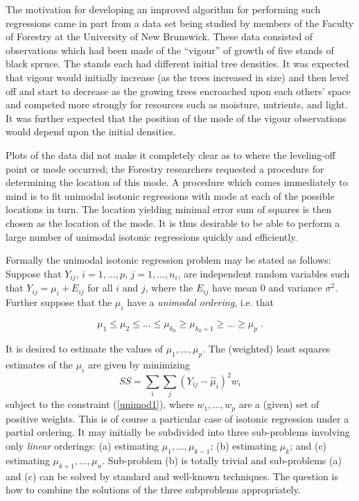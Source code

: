 The motivation for developing an improved algorithm for performing
such regressions came in part from a data set being studied by
members of the Faculty of Forestry at the University of New Brunswick.
These data consisted of observations which had been made of the
``vigour'' of growth of five stands of black spruce.  The stands each
had different initial tree densities.  It was expected that vigour
would initially increase (as the trees increased in size) and then
level off and start to decrease as the growing trees encroached upon
each others' space and competed more strongly for resources such as
moisture, nutrients, and light.  It was further expected that the
position of the mode of the vigour observations would depend upon the
initial densities.

Plots of the data did not make it completely clear as to where the
leveling-off point or mode occurred; the Forestry researchers
requested a procedure for determining the location of this mode.  A
procedure which comes immediately to mind is to fit unimodal isotonic
regressions with mode at each of the possible locations in turn.  The
location yielding minimal error sum of squares is then chosen as the
location of the mode.  It is thus desirable to be able to perform a
large number of unimodal isotonic regressions quickly and
efficiently.

Formally the unimodal isotonic regression problem may be stated as
follows:  Suppose that $Y_{ij}$, $i=1, \ldots, p$, $j = 1, \ldots,
n_i$, are independent random variables such that $Y_{ij} = \mu_i +
E_{ij}$ for all $i$ and $j$, where the $E_{ij}$ have mean 0 and
variance $\sigma^2$.  Further suppose that the $\mu_i$ have a
{\em unimodal ordering}, i.e. that

\begin{equation}
\label{unimod1}
\mu_1 \leq \mu_2 \leq \ldots \leq \mu_{k_0} \geq \mu_{k_0 + 1}
\geq \ldots \geq \mu_p \;.
\end{equation}

It is desired to estimate the values of $\mu_1, \ldots,
\mu_p$.  The (weighted) least squares estimates of the
$\mu_i$ are given by minimizing
\[
SS = \sum_i \sum_j (Y_{ij} - \hat{\mu}_i)^2 w_i
\]
subject to the constraint (\ref{unimod1}), where $w_1,
\ldots, w_p$ are a (given) set of positive weights.  This
is of course a particular case of isotonic regression under
a partial ordering.  It may initially be subdivided into
three sub-problems involving only {\em linear} orderings:
(a) estimating $\mu_1, \ldots , \mu_{k-1}$; (b) estimating
$\mu_k$; and (c) estimating $\mu_{k+1}, \ldots , \mu_n$.
Sub-problem (b) is totally trivial and sub-problems (a) and
(c) can be solved by standard and well-known techniques.
The question is how to combine the solutions of the three
subproblems appropriately.


